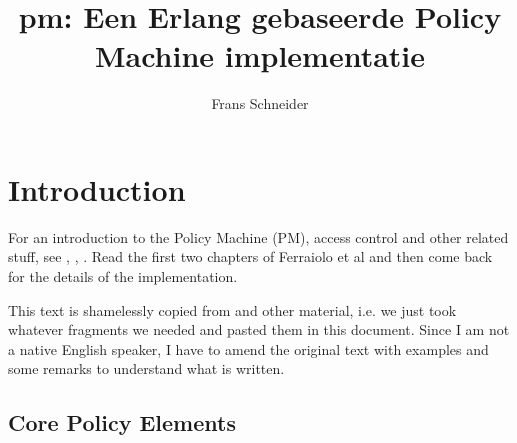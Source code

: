 \documentclass[12pt,a4paper,titlepage]{book}
\author{Frans Schneider}
\title{pm: Een Erlang gebaseerde Policy Machine implementatie}
\begin{document}
	\maketitle
	\tableofcontents
	
	\lstset{
		language=erlang,
		basicstyle=\small\ttfamily,
		breaklines=true,                 %
		captionpos=b,                    %
		keepspaces=true,                 %
		tabsize=4
	}
	
	\chapter{Introduction}
	
	For an introduction to the Policy Machine (PM), access control and other related stuff, see \cite{NISTIR-7987-REV-1}, \cite{NISTIR-7316}, \cite{Assessment-AC-Systems}. Read the first two chapters of Ferraiolo et al \cite{NISTIR-7987-REV-1} and then come back for the details of the implementation.
	
	This text is shamelessly copied from \cite{NISTIR-7987-REV-1} and other material, i.e. we just took whatever fragments we needed and pasted them in this document. Since I am not a native English speaker, I have to amend the original text with examples and some remarks to understand what is written.
	
	\section{Core Policy Elements}
	
\end{document}
